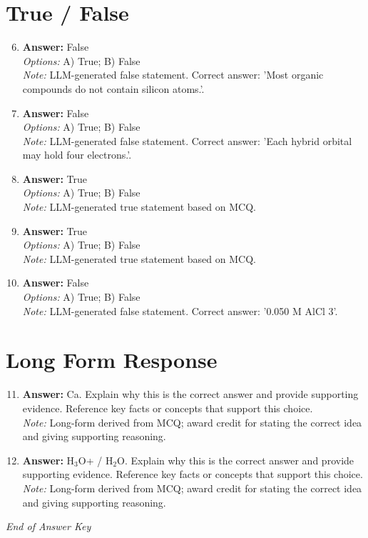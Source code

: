 \documentclass[12pt]{article}
\begin{document}
\section*{True / False}
\begin{enumerate}[label=\arabic*.]
\setcounter{enumi}{5}
\item \textbf{Answer:} False
\\ \textit{Options:} A) True; B) False
\\ \textit{Note:} LLM-generated false statement. Correct answer: 'Most organic compounds do not contain silicon atoms.'.
\item \textbf{Answer:} False
\\ \textit{Options:} A) True; B) False
\\ \textit{Note:} LLM-generated false statement. Correct answer: 'Each hybrid orbital may hold four electrons.'.
\item \textbf{Answer:} True
\\ \textit{Options:} A) True; B) False
\\ \textit{Note:} LLM-generated true statement based on MCQ.
\item \textbf{Answer:} True
\\ \textit{Options:} A) True; B) False
\\ \textit{Note:} LLM-generated true statement based on MCQ.
\item \textbf{Answer:} False
\\ \textit{Options:} A) True; B) False
\\ \textit{Note:} LLM-generated false statement. Correct answer: '0.050 M AlCl 3'.
\end{enumerate}

\section*{Long Form Response}
\begin{enumerate}[label=\arabic*.]
\setcounter{enumi}{10}
\item \textbf{Answer:} Ca. Explain why this is the correct answer and provide supporting evidence. Reference key facts or concepts that support this choice.
\\ \textit{Note:} Long-form derived from MCQ; award credit for stating the correct idea and giving supporting reasoning.
\item \textbf{Answer:} H$_{3}$O+ / H$_{2}$O. Explain why this is the correct answer and provide supporting evidence. Reference key facts or concepts that support this choice.
\\ \textit{Note:} Long-form derived from MCQ; award credit for stating the correct idea and giving supporting reasoning.
\end{enumerate}

\vfill
\noindent\textit{End of Answer Key}
\end{document}

